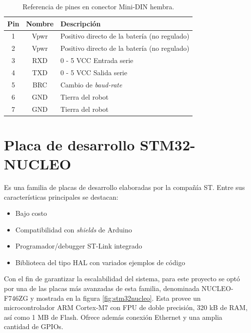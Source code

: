 \begin{table}[h]
    \centering
    \caption{Referencia de pines en conector Mini-DIN hembra.}
    \label{tab:Pines}
    \begin{tabular}{ccl}
        \toprule
        \textbf{Pin} & \textbf{Nombre} & \textbf{Descripción}                         \\
        \midrule
        1            & Vpwr            & Positivo directo de la batería (no regulado) \\
        2            & Vpwr            & Positivo directo de la batería (no regulado) \\
        3            & RXD             & 0 - 5 VCC Entrada serie                      \\
        4            & TXD             & 0 - 5 VCC Salida serie                       \\
        5            & BRC             & Cambio de \textit{baud-rate}                 \\
        6            & GND             & Tierra del robot                             \\
        7            & GND             & Tierra del robot                             \\
        \bottomrule
        \hline
    \end{tabular}
    \label{tab:distribucionPines}
\end{table}

\newpage

\section{Placa de desarrollo STM32-NUCLEO}

Es una familia de placas de desarrollo elaboradas por la compañía ST. Entre sus características principales se destacan:

\begin{itemize}
    \item Bajo costo
    \item Compatibilidad con \textit{shields} de Arduino
    \item Programador/debugger ST-Link integrado
    \item Biblioteca del tipo HAL con variados ejemplos de código
\end{itemize}

Con el fin de garantizar la escalabilidad del sistema, para este proyecto se optó por una de las placas más avanzadas de esta familia, denominada NUCLEO-F746ZG y mostrada en la figura \ref{fig:stm32nucleo}. Esta provee un microcontrolador ARM Cortex-M7 con FPU de doble precisión, 320 kB de RAM, así como 1 MB de Flash. Ofrece además conexión Ethernet y una amplia cantidad de GPIOs.

